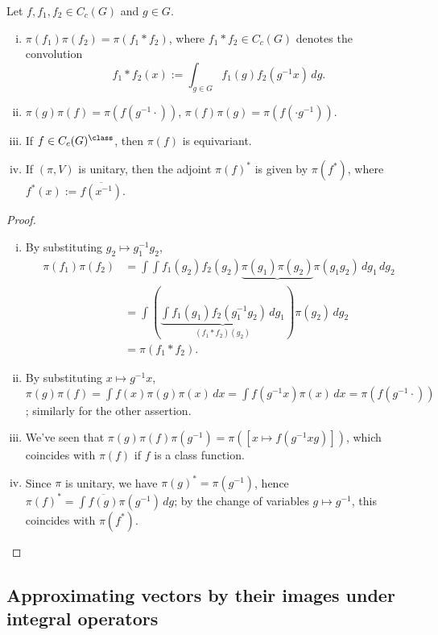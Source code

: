 \documentclass[reqno]{amsart} 
\begin{document}
\begin{lemma}\label{lem:integral-ops-basic-properties}
  Let $f, f_1, f_2 \in C_c(G)$ and $g \in G$.
  \begin{enumerate}
[(i)]
  \item $\pi(f_1) \pi(f_2) = \pi(f_1 \ast f_2)$, where $f_1 \ast f_2 \in C_c(G)$ denotes the convolution
    \begin{equation*}
      f_1 \ast f_2(x) := \int_{g \in G} f_1(g) f_2(g^{-1} x) \, d g.
    \end{equation*}
  \item $\pi(g) \pi(f) = \pi(f(g^{-1} \cdot))$, $\pi(f) \pi(g) = \pi(f(\cdot g^{-1}))$.
  \item If $f \in C_c(G)^{\class}$, then $\pi(f)$ is equivariant.
  \item If $(\pi,V)$ is unitary, then the adjoint $\pi(f)^*$ is given by $\pi(f^*)$, where $f^*(x) := \overline{f(x^{-1})}$.
  \end{enumerate}
\end{lemma}
\begin{proof}
  \begin{enumerate}
[(i)]
  \item By substituting $g_2 \mapsto g_1^{-1} g_2$,
    \begin{align*}
      \pi(f_1) \pi(f_2)
      &= \int \int f_1(g_2) f_2(g_2)
        \underbrace{\pi(g_1) \pi(g_2)}{\pi(g_1 g_2)} \, d
        g_1 \, d g_2
      \\
      &=
        \int (\underbrace{\int f_1(g_1) f_2(g_1^{-1} g_2) \,
        d g_1}_{(f_1 \ast f_2)(g_2)})
        \pi(g_2) \, d g_2
      \\
      &=
        \pi(f_1 \ast f_2).
    \end{align*}
  \item By substituting $x \mapsto g^{-1} x$, $\pi(g) \pi(f) = \int f(x) \pi(g) \pi(x) \, d x = \int f(g^{-1} x) \pi(x) \, d x = \pi(f(g^{-1} \cdot))$; similarly for the other assertion.
  \item We've seen that $\pi(g) \pi(f) \pi(g^{-1}) = \pi([x \mapsto f(g^{-1} x g)])$, which coincides with $\pi(f)$ if $f$ is a class function.
  \item Since $\pi$ is unitary, we have $\pi(g)^* = \pi(g^{-1})$, hence $\pi(f)^* = \int \overline{f(g)} \pi(g^{-1}) \, d g$; by the change of variables $g \mapsto g^{-1}$, this coincides with $\pi(f^*)$.
  \end{enumerate}
\end{proof}

\subsection{Approximating vectors by their images under integral operators}\label{sec:appr-vect-their}
\end{document}
